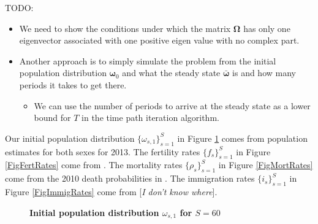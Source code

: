 \documentclass[letterpaper,12pt]{article}
\theoremstyle{definition}
\begin{document}
  \noindent TODO:
  \begin{itemize}
    \item We need to show the conditions under which the matrix $\bm{\Omega}$ has only one eigenvector associated with one positive eigen value with no complex part.
    \item Another approach is to simply simulate the problem from the initial population distribution $\bm{\omega}_0$ and what the steady state $\bm{\bar{\omega}}$ is and how many periods it takes to get there.
      \begin{itemize}
        \item We can use the number of periods to arrive at the steady state as a lower bound for $T$ in the time path iteration algorithm.
      \end{itemize}
  \end{itemize}

  Our initial population distribution $\{\omega_{s,1}\}_{s=1}^S$ in Figure \ref{FigInitPopDist} comes from \citet{Census:2014} population estimates for both sexes for 2013. The fertility rates $\{f_s\}_{s=1}^S$ in Figure \ref{FigFertRates} come from \citet[Table 1]{NVSR:2011}. The mortality rates $\{\rho_s\}_{s=1}^S$ in Figure \ref{FigMortRates} come from the 2010 death probabilities in \citet{SocSec:2010}. The immigration rates $\{i_s\}_{s=1}^S$ in Figure \ref{FigImmigRates} come from [\textit{I don't know where}].

  \begin{figure}[htbp]\centering \captionsetup{width=4.0in}
    \caption{\label{FigInitPopDist}\textbf{Initial population distribution $\omega_{s,1}$ for $S=60$}}
  \end{figure}
\end{document}
